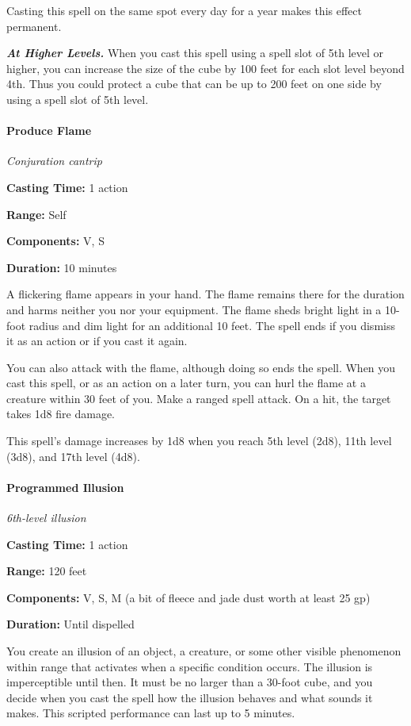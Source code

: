 \documentclass[
]{article}
\begin{document}
Casting this spell on the same spot every day for a year makes this
effect permanent.

\emph{\textbf{At Higher Levels.}} When you cast this spell using a spell
slot of 5th level or higher, you can increase the size of the cube by
100 feet for each slot level beyond 4th. Thus you could protect a cube
that can be up to 200 feet on one side by using a spell slot of 5th
level.

\hypertarget{produce-flame}{%
\paragraph{Produce Flame}\label{produce-flame}}

\emph{Conjuration cantrip}

\textbf{Casting Time:} 1 action

\textbf{Range:} Self

\textbf{Components:} V, S

\textbf{Duration:} 10 minutes

A flickering flame appears in your hand. The flame remains there for the
duration and harms neither you nor your equipment. The flame sheds
bright light in a 10-foot radius and dim light for an additional 10
feet. The spell ends if you dismiss it as an action or if you cast it
again.

You can also attack with the flame, although doing so ends the spell.
When you cast this spell, or as an action on a later turn, you can hurl
the flame at a creature within 30 feet of you. Make a ranged spell
attack. On a hit, the target takes 1d8 fire damage.

This spell's damage increases by 1d8 when you reach 5th level (2d8),
11th level (3d8), and 17th level (4d8).

\hypertarget{programmed-illusion}{%
\paragraph{Programmed Illusion}\label{programmed-illusion}}

\emph{6th-level illusion}

\textbf{Casting Time:} 1 action

\textbf{Range:} 120 feet

\textbf{Components:} V, S, M (a bit of fleece and jade dust worth at
least 25 gp)

\textbf{Duration:} Until dispelled

You create an illusion of an object, a creature, or some other visible
phenomenon within range that activates when a specific condition occurs.
The illusion is imperceptible until then. It must be no larger than a
30-foot cube, and you decide when you cast the spell how the illusion
behaves and what sounds it makes. This scripted performance can last up
to 5 minutes.
\end{document}
